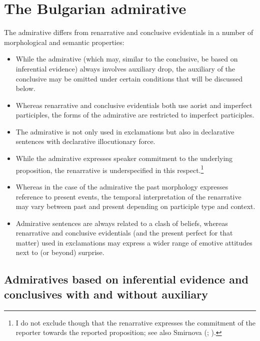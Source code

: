 \documentclass[output=paper,
colorlinks,
citecolor=brown,
newtxmath
]{langscibook}
\begin{document}
\section{The Bulgarian admirative}\label{sec:BG-admirative}

The  admirative differs from renarrative and conclusive evidentials in a number of morphological and semantic properties:

\begin{itemize}
    \item While the admirative (which may, similar to the conclusive, be based on inferential evidence) always involves auxiliary drop, the auxiliary of the conclusive may be omitted under certain conditions that will be discussed below.
    \item Whereas renarrative and conclusive evidentials both use aorist and imperfect participles, the forms of the admirative are restricted to imperfect participles.
    \item The admirative is not only used in exclamations but also in declarative sentences with declarative illocutionary force.
    \item While the admirative expresses speaker commitment to the underlying proposition, the renarrative is underspecified in this respect.\footnote{I do not exclude though that the renarrative expresses the commitment of the reporter towards the reported proposition; see also Smirnova (\citeyear{Smirnova2011a}; \citeyear{Smirnova2013}).}
    \item Whereas in the case of the admirative the past morphology expresses reference to present events, the temporal interpretation of the renarrative may vary between past and present depending on participle type and context.
    \item Admirative sentences are always related to a clash of beliefs, whereas renarrative and conclusive evidentials (and the present perfect for that matter) used in exclamations may express a wider range of emotive attitudes next to (or beyond) surprise.
\end{itemize}

\subsection{Admiratives based on inferential evidence and conclusives with and without auxiliary}
\end{document}
